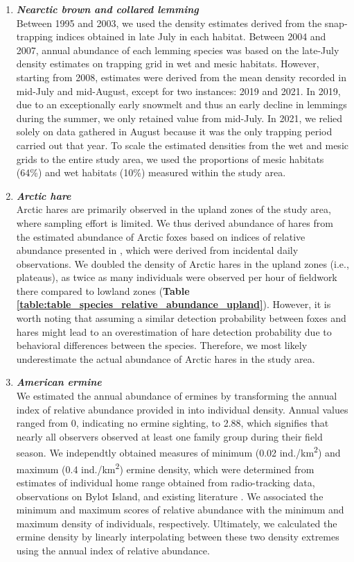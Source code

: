 \documentclass[a4paper,twoside,12pt]{article}
\begin{document}
\begin{enumerate}[label=\alph*.]
        \item[] \textit{\textbf{Nearctic brown and collared lemming}}\\
        Between 1995 and 2003, we used the density estimates derived from the snap-trapping indices obtained in late July in each habitat. Between 2004 and 2007, annual abundance of each lemming species was based on the late-July density estimates on trapping grid in wet and mesic habitats. However, starting from 2008, estimates were derived from the mean density recorded in mid-July and mid-August, except for two instances: 2019 and 2021. In 2019, due to an exceptionally early snowmelt and thus an early decline in lemmings during the summer, we only retained value from mid-July. In 2021, we relied solely on data gathered in August because it was the only trapping period carried out that year. To scale the estimated densities from the wet and mesic grids to the entire study area, we used the proportions of mesic habitats (64\%) and wet habitats (10\%) measured within the study area.
        
                \item[] \textit{\textbf{Arctic hare}}\\
                Arctic hares are primarily observed in the upland zones of the study area, where sampling effort is limited. We thus derived abundance of hares from the estimated abundance of Arctic foxes based on indices of relative abundance presented in \citep{gauthier2024a}, which were derived from incidental daily observations. We doubled the density of Arctic hares in the upland zones (i.e., plateaus), as twice as many individuals were observed per hour of fieldwork there compared to lowland zones (\textbf{Table \ref{table:table_species_relative_abundance_upland}}). However, it is worth noting that assuming a similar detection probability between foxes and hares might lead to an overestimation of hare detection probability due to behavioral differences between the species. Therefore, we most likely underestimate the actual abundance of Arctic hares in the study area.
                
                \item[] \textit{\textbf{American ermine}}\\
   				We estimated the annual abundance of ermines by transforming the annual index of relative abundance provided in \citet{bolduc2023} into individual density. Annual values ranged from 0, indicating no ermine sighting, to 2.88, which signifies that nearly all observers observed at least one family group during their field season. We independtly obtained measures of minimum (0.02 ind./km\textsuperscript{2}) and maximum (0.4 ind./km\textsuperscript{2}) ermine density, which were determined from estimates of individual home range obtained from radio-tracking data, observations on Bylot Island, and existing literature \citep{legagneux2012, bilodeau2013}. We associated the minimum and maximum scores of relative abundance with the minimum and maximum density of individuals, respectively. Ultimately, we calculated the ermine density by linearly interpolating between these two density extremes using the annual index of relative abundance.
                

\end{enumerate}
\end{document}
